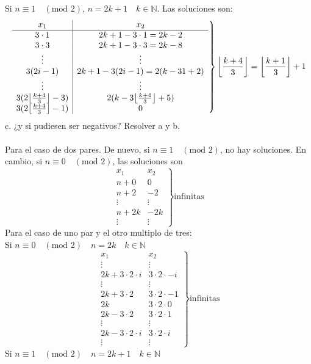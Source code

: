 \documentclass{article}
\DeclarePairedDelimiter{\floor}{\lfloor}{\rfloor}
\begin{document}
Si $n \equiv 1 \quad (\text{mod }2)$, $n=2k+1 \quad k \in \mathbb{N}$. Las soluciones son:
$$
\left. \begin{array}{c|c}
    x_1 & x_2 \\ \hline
    3\cdot 1 & 2k+1-3\cdot 1 = 2k-2\\
    3\cdot 3 & 2k+1-3\cdot 3 = 2k-8 \\
    \vdots & \vdots \\
    3(2i-1) & 2k+1-3(2i-1)=2(k-31+2)\\
    \vdots & \vdots \\
    3(2\floor*{\frac{k+4}{3}}-3) & 2(k-3\floor*{\frac{k+4}{3}}+5)\\
    3(2\floor*{\frac{k+4}{3}}-1) & 0
\end{array}\right\}
\floor*{\frac{k+4}{3}} = \floor*{\frac{k+1}{3}}+1
$$\newpage\noindent
c. ¿y si pudiesen ser negativos? Resolver a y b.\\\\
Para el caso de dos pares. De nuevo, si $n\equiv1 \quad (\text{mod }2)$, no hay soluciones. En cambio, si $n\equiv0 \quad (\text{mod }2)$, las soluciones son
$$
\left. \begin{array}{c|c}
    x_1 & x_2 \\ \hline
    n+0 & 0 \\
    n+2 & -2 \\
    \vdots & \vdots \\
    n+2k & -2k \\
    \vdots & \vdots
\end{array}\right\}\text{infinitas}
$$
Para el caso de uno par y el otro multiplo de tres:\\
Si $n\equiv 0 \quad (\text{mod }2) \quad n=2k\quad k \in \mathbb{N}$
$$
\left.\begin{array}{c|c}
    x_1 & x_2 \\ \hline
    \vdots & \vdots \\
    2k+ 3\cdot 2 \cdot i & 3\cdot 2\cdot -i \\
    \vdots & \vdots \\
    2k+3\cdot 2 & 3\cdot 2\cdot -1 \\
    2k & 3\cdot 2 \cdot 0 \\
    2k-3\cdot 2 & 3\cdot 2 \cdot 1 \\
    \vdots & \vdots \\
    2k- 3\cdot 2 \cdot i & 3\cdot 2\cdot i \\
    \vdots & \vdots
\end{array}\right\}\text{infinitas}
$$
Si $n\equiv 1 \quad (\text{mod }2) \quad n=2k+1 \quad k \in \mathbb{N}$
\end{document}
